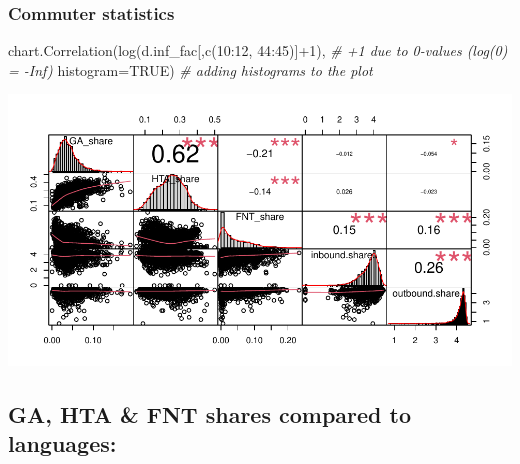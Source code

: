 \documentclass[
]{article}
\newenvironment{Shaded}{\begin{snugshade}}{\end{snugshade}}
\newcommand{\AttributeTok}[1]{\textcolor[rgb]{0.77,0.63,0.00}{#1}}
\newcommand{\CommentTok}[1]{\textcolor[rgb]{0.56,0.35,0.01}{\textit{#1}}}
\newcommand{\ConstantTok}[1]{\textcolor[rgb]{0.00,0.00,0.00}{#1}}
\newcommand{\DecValTok}[1]{\textcolor[rgb]{0.00,0.00,0.81}{#1}}
\newcommand{\FunctionTok}[1]{\textcolor[rgb]{0.00,0.00,0.00}{#1}}
\newcommand{\NormalTok}[1]{#1}
\newcommand{\SpecialCharTok}[1]{\textcolor[rgb]{0.00,0.00,0.00}{#1}}
\begin{document}
\hypertarget{commuter-statistics}{%
\subsubsection{Commuter statistics}\label{commuter-statistics}}

\begin{Shaded}
\begin{Highlighting}[]
\FunctionTok{chart.Correlation}\NormalTok{(}\FunctionTok{log}\NormalTok{(d.inf\_fac[,}\FunctionTok{c}\NormalTok{(}\DecValTok{10}\SpecialCharTok{:}\DecValTok{12}\NormalTok{, }\DecValTok{44}\SpecialCharTok{:}\DecValTok{45}\NormalTok{)]}\SpecialCharTok{+}\DecValTok{1}\NormalTok{), }\CommentTok{\# +1 due to 0{-}values (log(0) = {-}Inf)}
                  \AttributeTok{histogram=}\ConstantTok{TRUE}\NormalTok{) }\CommentTok{\# adding histograms to the plot}
\end{Highlighting}
\end{Shaded}

\includegraphics{Lin_Mod_Clus_Anal_files/figure-latex/unnamed-chunk-14-1.pdf}

\hypertarget{ga-hta-fnt-shares-compared-to-languages}{%
\subsection{GA, HTA \& FNT shares compared to
languages:}\label{ga-hta-fnt-shares-compared-to-languages}}
\end{document}

